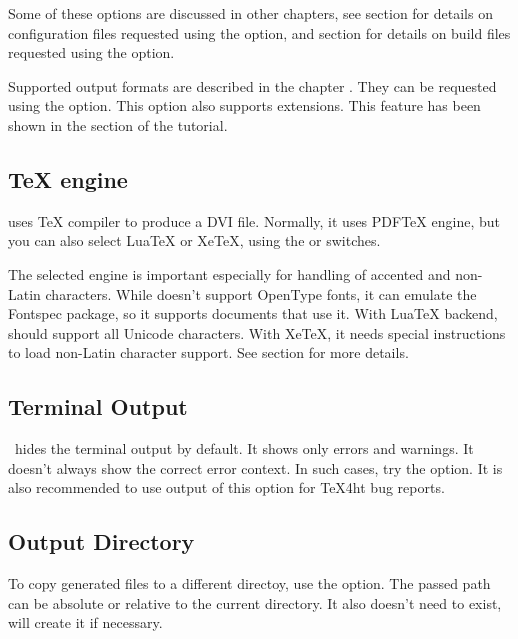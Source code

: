 Some of these options are discussed in other chapters, see section 
for details on configuration files requested using the  option,
and section  for details on build files requested using 
the  option.

Supported  output formats are described in the chapter . They can be requested using the  option.
This option also supports extensions. This feature has been shown in the section  of the tutorial.

\subsection{\TeX{} engine}

\makefourht{} uses \TeX{} compiler to produce a DVI file. Normally, it uses PDF\TeX{} engine, but you can also select Lua\TeX{} or 
Xe\TeX{}, using the  or  switches.

The selected engine is important especially for handling of accented and non-Latin characters. While \texfourht{} doesn't support
OpenType fonts, it can emulate the Fontspec package, so it supports documents that use it. With Lua\TeX{} backend, \texfourht{}
should support all Unicode characters. With Xe\TeX{}, it needs special instructions to load non-Latin character support. See
 section for more details.


\subsection{Terminal Output}

\makefourht\ hides the terminal output by default. It shows only errors and warnings.
It doesn't always show the correct error context. In such cases, try the  option.
It is also recommended to use output of this option for \TeX4ht bug reports.



\subsection{Output Directory}

To copy generated files to a different directoy, use the  option. The passed path
can be absolute or relative to the current directory. It also doesn't need to exist, \makefourht{}
will create it if necessary.

